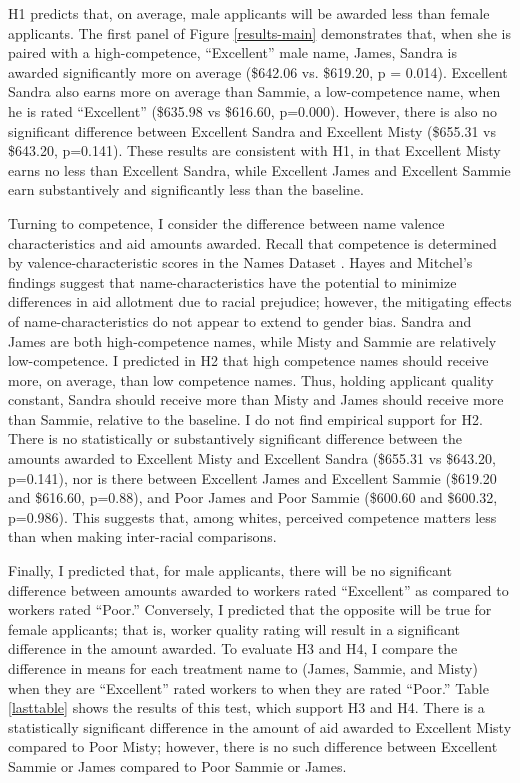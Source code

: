 \documentclass[12pt]{article}%
\begin{document}
\begin{doublespace}
H1 predicts that, on average, male applicants will be awarded less than female applicants. The first panel of Figure \ref{results-main} demonstrates that, when she is paired with a high-competence, ``Excellent” male name, James, Sandra is awarded significantly more on average (\$642.06 vs. \$619.20, p = 0.014). Excellent Sandra also earns more on average than Sammie, a low-competence name, when he is rated ``Excellent” (\$635.98 vs \$616.60, p=0.000). However, there is also no significant difference between Excellent Sandra and Excellent Misty (\$655.31 vs \$643.20, p=0.141). These results are consistent with H1, in that Excellent Misty earns no less than Excellent Sandra, while Excellent James and Excellent Sammie earn substantively and significantly less than the baseline.

Turning to competence, I consider the difference between name valence characteristics and aid amounts awarded. Recall that competence is determined by valence-characteristic scores in the Names Dataset \citep{hayes_2020}. Hayes and Mitchel’s findings suggest that name-characteristics have the potential to minimize differences in aid allotment due to racial prejudice; however, the mitigating effects of name-characteristics do not appear to extend to gender bias. Sandra and James are both high-competence names, while Misty and Sammie are relatively low-competence. I predicted in H2 that high competence names should receive more, on average, than low competence names. Thus, holding applicant quality constant, Sandra should receive more than Misty and James should receive more than Sammie, relative to the baseline. I do not find empirical support for H2. There is no statistically or substantively significant difference between the amounts awarded to Excellent Misty and Excellent Sandra (\$655.31 vs \$643.20, p=0.141), nor is there between Excellent James and Excellent Sammie (\$619.20 and \$616.60, p=0.88), and Poor James and Poor Sammie (\$600.60 and \$600.32, p=0.986). This suggests that, among whites, perceived competence matters less than when making inter-racial comparisons.

Finally, I predicted that, for male applicants, there will be no significant difference between amounts awarded to workers rated ``Excellent” as compared to workers rated ``Poor.” Conversely, I predicted that the opposite will be true for female applicants; that is, worker quality rating will result in a significant difference in the amount awarded. To evaluate H3 and H4, I compare the difference in means for each treatment name to (James, Sammie, and Misty) when they are ``Excellent” rated workers to when they are rated ``Poor.” Table \ref{lasttable} shows the results of this test, which support H3 and H4. There is a statistically significant difference in the amount of aid awarded to Excellent Misty compared to Poor Misty; however, there is no such difference between Excellent Sammie or James compared to Poor Sammie or James.


\end{doublespace}
\end{document}
